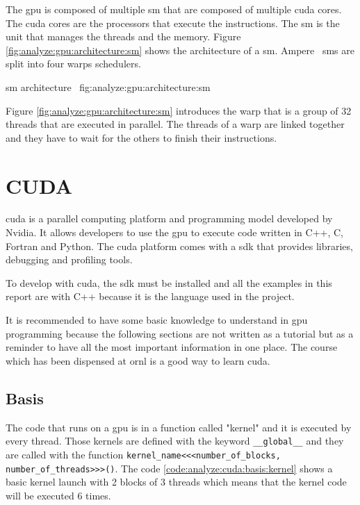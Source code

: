 The \acrshort{gpu} is composed of multiple \acrfull{sm} that are composed of
multiple \acrfull{cuda} cores.
The \acrshort{cuda} cores are the processors that execute the instructions.
The \acrshort{sm} is the unit that manages the threads and the memory.
Figure \ref{fig:analyze:gpu:architecture:sm} shows the architecture of a \acrshort{sm}.
Ampere~\cite{ampere} \acrshort{sm}s are split into four warps schedulers.

{\acrshort{sm} architecture~\cite{nvidia-a100-architecture}}
{fig:analyze:gpu:architecture:sm}

Figure \ref{fig:analyze:gpu:architecture:sm} introduces the warp that is a
group of 32 threads that are executed in parallel.
The threads of a warp are linked together and they have to wait for the others
to finish their instructions.


\section{CUDA}
\label{ch:analyze:cuda}

\acrfull{cuda} is a parallel computing platform and programming model developed
by Nvidia.
It allows developers to use the \acrshort{gpu} to execute code written in C++, C, Fortran
and Python.
The \acrshort{cuda} platform comes with a \acrshort{sdk} that provides
libraries, debugging and profiling tools.

To develop with \acrshort{cuda}, the \acrshort{sdk} must be installed and all
the examples in this report are with C++ because it is the language used in the
project.

It is recommended to have some basic knowledge to understand in \acrshort{gpu}
programming because the following sections are not written as a tutorial but as
a reminder to have all the most important information in one place.
The course~\cite{cuda-training} which has been dispensed at \acrshort{ornl} is
a good way to learn \acrshort{cuda}.

\subsection{Basis}
\label{ch:analyze:cuda:basis}

The code that runs on a \acrshort{gpu} is in a function called "kernel" and it
is executed by every thread.
Those kernels are defined with the keyword \texttt{\_\_global\_\_} and they are called
with the function \texttt{kernel\_name<<<number\_of\_blocks, number\_of\_threads>>>()}.
The code \ref{code:analyze:cuda:basis:kernel} shows a basic kernel
launch with 2 blocks of 3 threads which means that the kernel code will be
executed 6 times.


